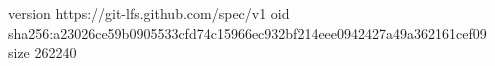 version https://git-lfs.github.com/spec/v1
oid sha256:a23026ce59b0905533cfd74c15966ec932bf214eee0942427a49a362161cef09
size 262240
